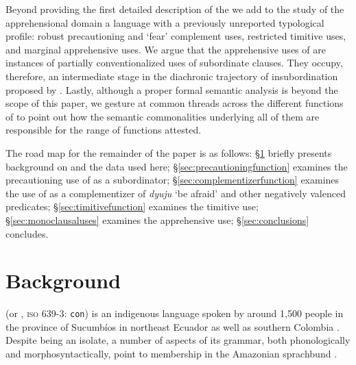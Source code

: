 \documentclass[output=paper,colorlinks,citecolor=brown]{langscibook}
\begin{document}
Beyond providing the first detailed description of the  \sane[,] we add to the study of the apprehensional domain a language with a previously unreported typological profile: robust precautioning and `fear' complement uses, restricted timitive uses, and marginal apprehensive uses. We argue that the apprehensive uses of  are instances of partially conventionalized uses of subordinate clauses. They occupy, therefore, an intermediate stage in the diachronic trajectory of insubordination proposed by \citet{evans2007insubordination}. Lastly, al\-though a proper formal semantic analysis is beyond the scope of this paper, we gesture at common threads across the different functions of  to point out how the semantic commonalities underlying all of them are responsible for the range of functions attested.

The road map for the remainder of the paper is as follows: \S\ref{sec:background} briefly presents background on  and the data used here; 
\S\ref{sec:precautioningfunction}  examines the precautioning use of  as a subordinator;
\S\ref{sec:complementizerfunction} examines the use of  as a complementizer of \emph{dyuju} `be afraid' and other negatively valenced predicates;
\S\ref{sec:timitivefunction}  examines the timitive use;
\S\ref{sec:monoclausaluses} examines the apprehensive use;
\S\ref{sec:conclusions} concludes.




\section{Background}
\label{sec:background}


 (or , {\textsc{iso} 639-3}: \texttt{con}) is an indigenous language spoken by around 1,500 people in the province of Sucumbíos in northeast Ecuador as well as southern Colombia \citep{dabkowski2021ldd}.
Despite being an isolate, a number of aspects of its grammar, both phonologically and morphosyntactically, point to membership in the Amazonian sprachbund \citep{fischerhengeveld, repetti-ludlow2019aingae,AELSS,sanker-reconstruction}.
\end{document}
